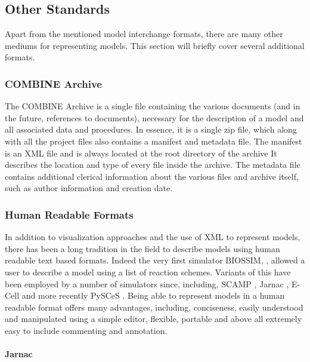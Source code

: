 \subsection{Other Standards}

Apart from the mentioned model interchange formats, there are many other
mediums for representing models. This section will briefly cover several
additional formats.

\subsubsection{COMBINE Archive}
\label{sec:combine-archive}
The COMBINE Archive \autocite{combine2014archive} is a single file containing the various documents (and in the future, references to documents), necessary for the description of a model and all associated data and procedures.
In essence, it is a single zip file, which along with all the project files also contains a manifest and metadata file.
The manifest is an XML file and is always located at the root directory of the archive
It describes the location and type of every file inside the archive.
The metadata file contains additional clerical information about the various files and archive itself, such as author information and creation date.

\subsubsection{Human Readable Formats}

In addition to visualization approaches and the use of XML to represent
models, there has been a long tradition in the field to describe models
using human readable text based formats. Indeed the very first simulator
BIOSSIM, \autocite{Ga68}, allowed a user to describe a model using a
list of reaction schemes. Variants of this have been employed by a
number of simulators since, including, SCAMP \autocite{SauroF91}, Jarnac
\autocite{sauro:2000}, E-Cell \autocite{ECELL} and more recently PySCeS
\autocite{Pysces2004}. Being able to represent models in a human
readable format offers many advantages, including, conciseness, easily
understood and manipulated using a simple editor, flexible, portable and
above all extremely easy to include commenting and annotation.

\paragraph{Jarnac}

